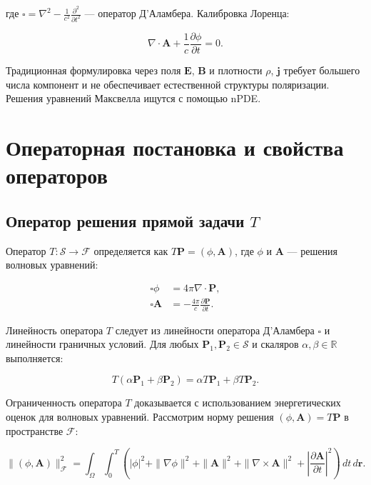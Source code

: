 \documentclass[sn-mathphys-num]{bst/sn-jnl}
\theoremstyle{thmstylethree}
\theoremstyle{thmstyletwo}
\theoremstyle{thmstyleone}
\begin{document}
где $\square = \nabla^2 - \frac{1}{c^2} \frac{\partial^2}{\partial t^2}$ --- оператор Д’Аламбера. Калибровка Лоренца:

\begin{equation}
    \nabla \cdot \mathbf{A} + \frac{1}{c} \frac{\partial \phi}{\partial t} = 0.
\end{equation}

Традиционная формулировка через поля $\mathbf{E}$, $\mathbf{B}$ и плотности $\rho$, $\mathbf{j}$ требует большего числа компонент и не обеспечивает естественной структуры поляризации. Решения уравнений Максвелла ищутся с помощью nPDE\cite{Zubov2021}.

\section{Операторная постановка и свойства операторов}
\label{sec:operator_properties}

\subsection{Оператор решения прямой задачи $T$}
Оператор $T: \mathcal{S} \to \mathcal{F}$ определяется как $T\mathbf{P} = (\phi, \mathbf{A})$, где $\phi$ и $\mathbf{A}$ --- решения волновых уравнений:

\begin{align}
    \square \phi &= 4\pi \nabla \cdot \mathbf{P}, \label{eq:wave_phi} \\
    \square \mathbf{A} &= -\frac{4\pi}{c} \frac{\partial \mathbf{P}}{\partial t}. \label{eq:wave_A}
\end{align}

Линейность оператора $T$ следует из линейности оператора Д’Аламбера $\square$ и линейности граничных условий. Для любых $\mathbf{P}_1, \mathbf{P}_2 \in \mathcal{S}$ и скаляров $\alpha, \beta \in \mathbb{R}$ выполняется:

\begin{equation}
    T(\alpha \mathbf{P}_1 + \beta \mathbf{P}_2) = \alpha T\mathbf{P}_1 + \beta T\mathbf{P}_2.
\end{equation}

Ограниченность оператора $T$ доказывается с использованием энергетических оценок для волновых уравнений. Рассмотрим норму решения $(\phi, \mathbf{A}) = T\mathbf{P}$ в пространстве $\mathcal{F}$:

\begin{equation}
    \|(\phi, \mathbf{A})\|_{\mathcal{F}}^2 = \int_\Omega \int_0^T \left( |\phi|^2 + \|\nabla \phi\|^2 + \|\mathbf{A}\|^2 + \|\nabla \times \mathbf{A}\|^2 + \left|\frac{\partial \mathbf{A}}{\partial t}\right|^2 \right) \, dt \, d\mathbf{r}.
\end{equation}
\end{document}
